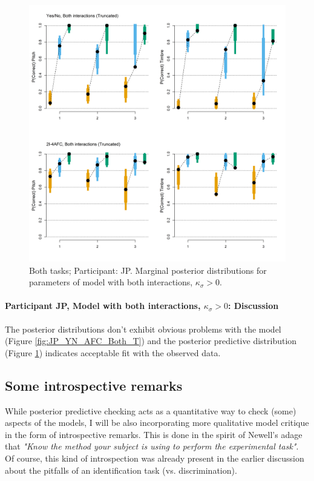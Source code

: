 \documentclass{article}\usepackage{knitr}
\begin{document}
\begin{figure}[H]
\centering
\includegraphics[scale=0.50, angle = 270]{Analysis_of_Human_Data/JP_post_pred_both_truncated}
\caption{Both tasks; Participant: JP. Marginal posterior distributions for parameters of model with both interactions, $\kappa_{\sigma} > 0$.}
\label{fig:JP_post_pred_both_truncated}
\end{figure}

\paragraph{Participant JP, Model with both interactions, $\kappa_{\sigma} > 0$: Discussion}

The posterior distributions don't exhibit obvious problems with the model (Figure \ref{fig:JP_YN_AFC_Both_T}) and the posterior predictive distribution (Figure \ref{fig:JP_post_pred_both_truncated}) indicates acceptable fit with the observed data.

\subsection{Some introspective remarks}
\label{sec:introspec}

While posterior predictive checking acts as a quantitative way to check (some) aspects of the models, I will be also incorporating more qualitative model critique in the form of introspective remarks. This is done in the spirit of Newell's adage that \textit{"Know the method your subject is using to perform the experimental task"}\citep{newell1973}. Of course, this kind of introspection was already present in the earlier discussion about the pitfalls of an identification task (vs. discrimination). 
\end{document}
